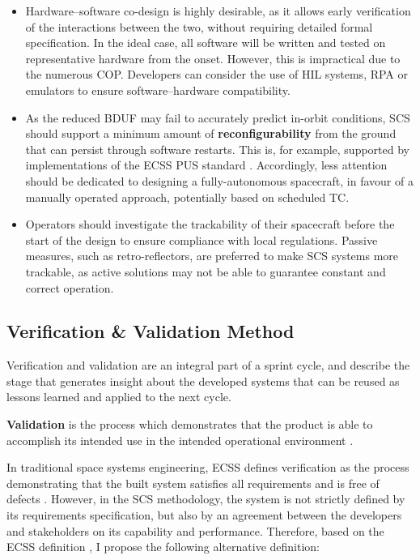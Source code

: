 \documentclass[a4paper,nobib,justified,final]{tufte-book}
\begin{document}
\begin{itemize}
	\item Hardware--software co-design is highly desirable, as it allows early verification of the interactions between the two, without requiring detailed formal specification. In the ideal case, all software will be written and tested on representative hardware from the onset. However, this is impractical due to the numerous \acl{COP}. Developers can consider the use of \acf{HIL} systems, \acf{RPA} or emulators to ensure software--hardware compatibility.
	\item As the reduced \acs{BDUF} may fail to accurately predict in-orbit conditions, \acs{SCS} should support a minimum amount of \textbf{reconfigurability} from the ground that can persist through software restarts. This is, for example, supported by implementations of the \acs{ECSS} \acl{PUS} standard \autocite{ECSS-E-ST-70-41C}. Accordingly, less attention should be dedicated to designing a fully-autonomous spacecraft, in favour of a manually operated approach, potentially based on scheduled \acs{TC}.
	\item Operators should investigate the trackability of their spacecraft before the start of the design to ensure compliance with local regulations. Passive measures, such as retro-reflectors, are preferred to make \acs{SCS} systems more trackable, as active solutions may not be able to guarantee constant and correct operation. 
\end{itemize}


\subsection{Verification \& Validation Method}
\label{sec:METHODOLOGY_verification}

Verification and validation are an integral part of a sprint cycle, and describe the stage that generates insight about the developed systems that can be reused as lessons learned and applied to the next cycle.


\begin{margindefinition}[Validation]
	\textbf{Validation} is the process which demonstrates that the product is able to accomplish its intended use in the intended operational environment \cite{ECSS-S-ST-00-01C}.
\end{margindefinition}

In traditional space systems engineering, \acs{ECSS} defines verification as the process demonstrating that the built system satisfies all requirements and is free of defects \cite{ECSS-S-ST-00-01C}. However, in the \ac{SCS} methodology, the system is not strictly defined by its requirements specification, but also by an agreement between the developers and stakeholders on its capability and performance. Therefore, based on the \acs{ECSS} definition \cite{ECSS-S-ST-00-01C}, I propose the following alternative definition:
\end{document}
